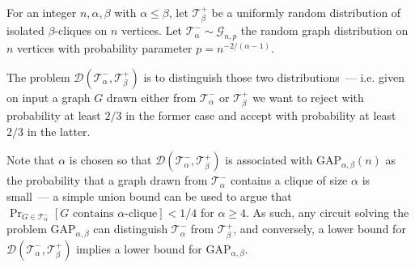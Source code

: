 \begin{definition}
    For an integer $n, \alpha, \beta$ with $\alpha \leq \beta$, let $\mathcal{T}^+_\beta$ be a uniformly random distribution of isolated $\beta$-cliques on $n$ vertices. Let $\mathcal{T}^-_{\alpha} \sim \mathcal{G}_{n, p}$ the \ErdosRenyi random graph distribution on $n$ vertices with probability parameter $p=n^{-2/(\alpha - 1)}$. 

    The problem $\mathcal{D}(\mathcal{T}^-_\alpha, \mathcal{T}^+_\beta)$ is to distinguish those two distributions~--- i.e. given on input a graph $G$ drawn either from $\mathcal{T}^-_{\alpha}$ or $\mathcal{T}^+_{\beta}$ we want to reject with probability at least $2/3$ in the former case and accept with probability at least $2/3$ in the latter.
\end{definition}
Note that $\alpha$ is chosen so that $\mathcal{D}(\mathcal{T}^-_\alpha, \mathcal{T}^+_\beta)$ is associated with $\mathrm{GAP}_{\alpha, \beta}(n)$ as the probability that a graph drawn from $\mathcal{T}^-_\alpha$ contains a clique of size $\alpha$ is small~--- a simple union bound can be used to argue that $\Pr_{G\in \mathcal{T}^-_\alpha}[G \text{ contains } \alpha \text{-clique}] < 1/4$ for $\alpha \geq 4$. As such, any circuit solving the problem $\mathrm{GAP}_{\alpha, \beta}$ can distinguish $\mathcal{T}^-_{\alpha}$ from $\mathcal{T}^+_{\beta}$, and conversely, a lower bound for $\mathcal{D}(\mathcal{T}^-_{\alpha}, \mathcal{T}^+_{\beta})$ implies a lower bound for $\mathrm{GAP}_{\alpha, \beta}$. 

